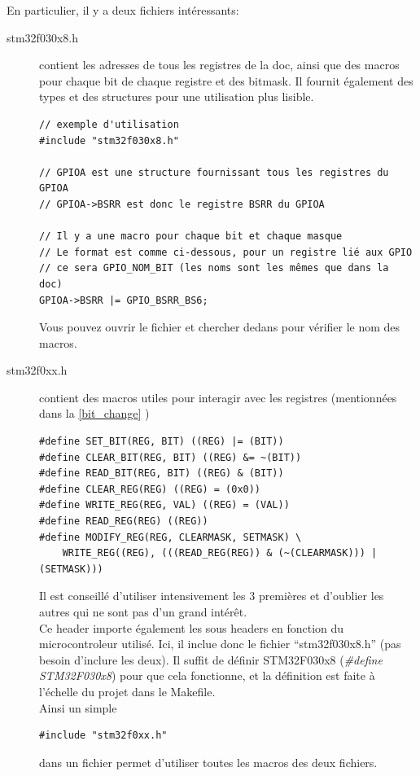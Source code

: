 \documentclass[a4paper,10pt]{article} %
\begin{document}
En particulier, il y a deux fichiers intéressants:
\begin{description}
    \item[stm32f030x8.h] contient les adresses de tous les registres de la doc, ainsi que des macros pour chaque bit de chaque registre et des bitmask. Il fournit également des types et des structures pour une utilisation plus lisible.

\begin{lstlisting}[frame=single]
// exemple d'utilisation
#include "stm32f030x8.h"

// GPIOA est une structure fournissant tous les registres du GPIOA
// GPIOA->BSRR est donc le registre BSRR du GPIOA

// Il y a une macro pour chaque bit et chaque masque
// Le format est comme ci-dessous, pour un registre lié aux GPIO
// ce sera GPIO_NOM_BIT (les noms sont les mêmes que dans la doc)
GPIOA->BSRR |= GPIO_BSRR_BS6;
\end{lstlisting}

Vous pouvez ouvrir le fichier et chercher dedans pour vérifier le nom des macros.

\item[stm32f0xx.h] contient des macros utiles pour interagir avec les registres (mentionnées dans la \autoref{bit_change} )

\begin{lstlisting}[frame=single]
#define SET_BIT(REG, BIT) ((REG) |= (BIT))
#define CLEAR_BIT(REG, BIT) ((REG) &= ~(BIT))
#define READ_BIT(REG, BIT) ((REG) & (BIT))
#define CLEAR_REG(REG) ((REG) = (0x0))
#define WRITE_REG(REG, VAL) ((REG) = (VAL))
#define READ_REG(REG) ((REG))
#define MODIFY_REG(REG, CLEARMASK, SETMASK) \
    WRITE_REG((REG), (((READ_REG(REG)) & (~(CLEARMASK))) | (SETMASK)))
\end{lstlisting}

Il est conseillé d'utiliser intensivement les 3 premières et d'oublier les autres qui ne sont pas d'un grand intérêt.\\

Ce header importe également les sous headers en fonction du microcontroleur utilisé. Ici, il inclue donc le fichier ``stm32f030x8.h'' (pas besoin d'inclure les deux). Il suffit de définir STM32F030x8 (\textit{\#define STM32F030x8}) pour que cela fonctionne, et la définition est faite à l'échelle du projet dans le Makefile.\\

Ainsi un simple
\begin{lstlisting}[frame=none]
#include "stm32f0xx.h"
\end{lstlisting}
dans un fichier permet d'utiliser toutes les macros des deux fichiers.
\end{description}
\end{document}
